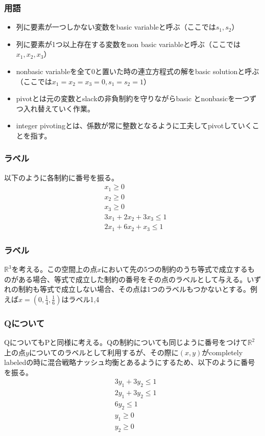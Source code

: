 \documentclass[dvipdfmx, 12pt]{beamer}
\begin{document}
\begin{frame}\frametitle{用語}
\begin{itemize}
	\item 列に要素が一つしかない変数をbasic variableと呼ぶ（ここでは$s_1, s_2$）
	\item 列に要素が1つ以上存在する変数をnon basic variableと呼ぶ（ここでは$x_1, x_2, x_3$）
	\item nonbasic variableを全て0と置いた時の連立方程式の解をbasic solutionと呼ぶ（ここでは$x_1 =  x_2 = x_3 = 0, s_1 = s_2 = 1$）
	\item pivotとは元の変数とslackの非負制約を守りながらbasic とnonbasicを一つずつ入れ替えていく作業。
	\item integer pivotingとは、係数が常に整数となるように工夫してpivotしていくことを指す。
\end{itemize}
\end{frame}

\begin{frame}\frametitle{ラベル}
以下のように各制約に番号を振る。
\begin{align}
	&x_1 \geq 0\\
	&x_2 \geq 0\\
	&x_3 \geq 0\\
	&3x_1 + 2x_2 + 3x_3 \leq 1\\
	&2x_1 + 6x_2 + x_3 \leq 1
\end{align}
\end{frame}

\begin{frame}\frametitle{ラベル}
$\mathbb{R}^3$を考える。この空間上の点$x$において先の5つの制約のうち等式で成立するものがある場合、等式で成立した制約の番号をその点のラベルとして与える。いずれの制約も等式で成立しない場合、その点は1つのラベルもつかないとする。例えば$x = (0, \frac{1}{4}, \frac{1}{6})$はラベル1,4
\end{frame}

\begin{frame}\frametitle{Qについて}
QについてもPと同様に考える。Qの制約についても同じように番号をつけて$\mathbb{R}^2$上の点$y$についてのラベルとして利用するが、その際に$(x, y)$がcompletely labeledの時に混合戦略ナッシュ均衡とあるようにするため、以下のように番号を振る。
\setcounter{equation}{0}
\begin{align}
	&3y_1 + 3y_2 \leq 1\\
	&2y_1 + 3y_2 \leq 1\\
	& 6y_2 \leq 1\\
	&y_1 \geq 0\\
	&y_2 \geq 0
\end{align}
\end{frame}
\end{document}
